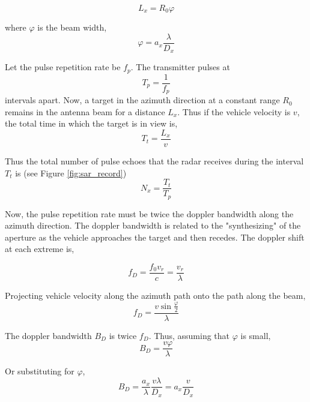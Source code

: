 \begin{equation}
\label{eq:Lx}
L_x=R_0\varphi
\end{equation}

where $\varphi$ is the beam width,
\begin{equation}
\label{eq:phi}
\varphi= a_x \frac{\lambda}{D_x}
\end{equation}



Let the pulse repetition rate be $f_p$. The transmitter pulses at
\begin{equation}
\label{ }
T_p= \frac{1}{f_p}
\end{equation}
intervals apart. Now, a target in the azimuth direction at a constant range $R_0$ remains in the antenna beam for a distance $L_x$. Thus if the vehicle velocity is $v$, the total time in which the target is in view is,
\begin{equation}
\label{ }
T_t=\frac{L_x}{v}
\end{equation}


Thus the total number of pulse echoes that the radar receives during the interval $T_t$ is (see Figure \ref{fig:sar_record})
\begin{equation}
\label{ }
N_x=\frac{T_t}{T_p}
\end{equation}


Now, the pulse repetition rate must  be twice the doppler bandwidth along the azimuth direction. The doppler bandwidth is related to the "synthesizing" of the aperture as the vehicle approaches the target and then recedes. The doppler shift at each extreme is,

\begin{equation}
\label{ }
f_D=\frac{f_0v_r}{c}=\frac{v_r}{\lambda}
\end{equation}

Projecting vehicle velocity along the azimuth path onto the path along the beam,
\begin{equation}
\label{ }
f_D=\frac{v\sin \frac{\varphi}{2}}{\lambda}
\end{equation}

The doppler bandwidth $B_D$ is twice $f_D$. Thus, assuming that $\varphi$ is small,
\begin{equation}
\label{ }
B_D = \frac{v\varphi}{\lambda}
\end{equation}

Or substituting for $\varphi$,
\begin{equation}
\label{ }
B_D=\frac{a_x}{\lambda}\frac{v\lambda}{D_x} = a_x\frac{v}{D_x}
\end{equation}

